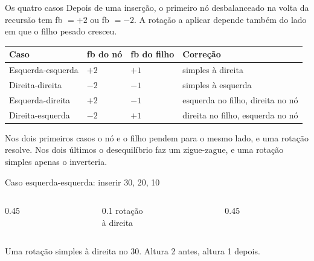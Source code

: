 \documentclass{beamer}
\begin{document}
\begin{frame}{Os quatro casos}
  Depois de uma inserção, o primeiro nó desbalanceado na volta da recursão tem
  fb $= +2$ ou fb $= -2$. A rotação a aplicar depende também do lado em que o
  filho pesado cresceu.

  \vspace{0.3cm}
  \begin{center}
    \footnotesize
    \begin{tabular}{llll}
      \toprule
      \textbf{Caso} & \textbf{fb do nó} & \textbf{fb do filho} & \textbf{Correção} \\
      \midrule
      Esquerda-esquerda & $+2$ & $+1$ & simples à direita \\
      Direita-direita & $-2$ & $-1$ & simples à esquerda \\
      Esquerda-direita & $+2$ & $-1$ & esquerda no filho, direita no nó \\
      Direita-esquerda & $-2$ & $+1$ & direita no filho, esquerda no nó \\
      \bottomrule
    \end{tabular}
  \end{center}

  \vspace{0.4cm}
  Nos dois primeiros casos o nó e o filho pendem para o mesmo lado, e uma
  rotação resolve. Nos dois últimos o desequilíbrio faz um zigue-zague, e uma
  rotação simples apenas o inverteria.
\end{frame}

\begin{frame}{Caso esquerda-esquerda: inserir 30, 20, 10}
  \begin{columns}
    \begin{column}{0.45\textwidth}
      \centering
    \end{column}
    \begin{column}{0.1\textwidth}
      \centering
      \scriptsize rotação\\ à direita
    \end{column}
    \begin{column}{0.45\textwidth}
      \centering
    \end{column}
  \end{columns}

  \vspace{0.6cm}
  \centering
  Uma rotação simples à direita no 30. Altura 2 antes, altura 1 depois.
\end{frame}
\end{document}
